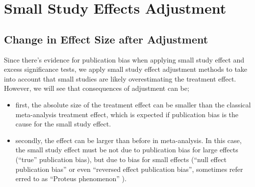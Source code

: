 \documentclass[11pt,a4paper,twoside]{book}\usepackage[]{graphicx}\usepackage[]{color}
\makeatletter
\newenvironment{kframe}{%
 \def\at@end@of@kframe{}%
 \ifinner\ifhmode%
  \def\at@end@of@kframe{\end{minipage}}%
  \begin{minipage}{\columnwidth}%
 \fi\fi%
 \def\FrameCommand##1{\hskip\@totalleftmargin \hskip-\fboxsep
 \colorbox{shadecolor}{##1}\hskip-\fboxsep
     \hskip-\linewidth \hskip-\@totalleftmargin \hskip\columnwidth}%
 \MakeFramed {\advance\hsize-\width
   \@totalleftmargin\z@ \linewidth\hsize
   \@setminipage}}%
 {\par\unskip\endMakeFramed%
 \at@end@of@kframe}
\newenvironment{knitrout}{}{} %
\makeatother
\begin{document}

\section{Small Study Effects Adjustment}
\begin{knitrout}
\color{fgcolor}\begin{kframe}


{\ttfamily\noindent\bfseries\color{errorcolor}{\#\# Error in Math.data.frame(structure(list(meta.id = c(9957L, 12985L, 49559L, : non-numeric variable(s) in data frame: id}}\end{kframe}
\end{knitrout}

\subsection{Change in Effect Size after Adjustment} \label{sec:change.size}

Since there's evidence for publication bias when applying small study effect and excess significance tests, we apply small study effect adjustment methods to take into account that small studies are likely overestimating the treatment effect. \\
However, we will see that consequences of adjustment can be; 
\begin{itemize}
\item first, the absolute size of the treatment effect can be smaller than the classical meta-analysis treatment effect, which is expected if publication bias
is the cause for the small study effect.
\item secondly, the effect can be larger than before in meta-analysis. In this case, the small study effect must be not due to publication bias for large effects (``true'' publication bias), but due to bias for small effects (``null effect publication bias'' or even ``reversed effect publication bias'', sometimes refer erred to as ``Proteus phenomenon'' \citep{proteus}).
\end{itemize}
\end{document}
